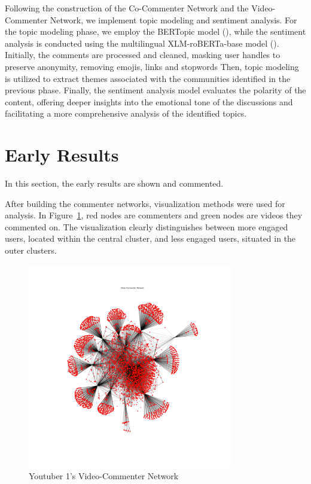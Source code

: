 \documentclass[12pt]{article}
\begin{document}
Following the construction of the Co-Commenter Network and the Video-Commenter Network, we implement
topic modeling and sentiment analysis. For the topic modeling phase, we employ the BERTopic model 
(\cite{bertopic2022}), while the sentiment analysis is conducted using the multilingual 
XLM-roBERTa-base model (\cite{barbieri-etal-2022-xlm}). 
Initially, the comments are processed and cleaned, masking user handles to preserve anonymity,
removing emojis, links and stopwords
Then, topic modeling is utilized to extract themes associated with the communities identified in the 
previous phase. Finally, the sentiment analysis model evaluates the polarity of the content, 
offering deeper insights into the emotional tone of the discussions and facilitating a more 
comprehensive analysis of the identified topics.


\section{Early Results}

In this section, the early results are shown and commented.

After building the commenter networks, visualization methods were used for analysis.
In Figure~\ref{fig:ytbr1_vc_net}, red nodes are commenters and green nodes are videos they commented on.
The visualization clearly distinguishes between more engaged users, 
located within the central cluster, and less engaged users, situated in the outer clusters.

\begin{figure}[t!]
    \centering
    \includegraphics[keepaspectratio,width=0.8\textwidth]{./imgs/felipeneto/felipeneto_video_commenter_network.png}
    \caption[width=\textwidth]{Youtuber 1's Video-Commenter Network}
    \label{fig:ytbr1_vc_net}
\end{figure}
\end{document}
